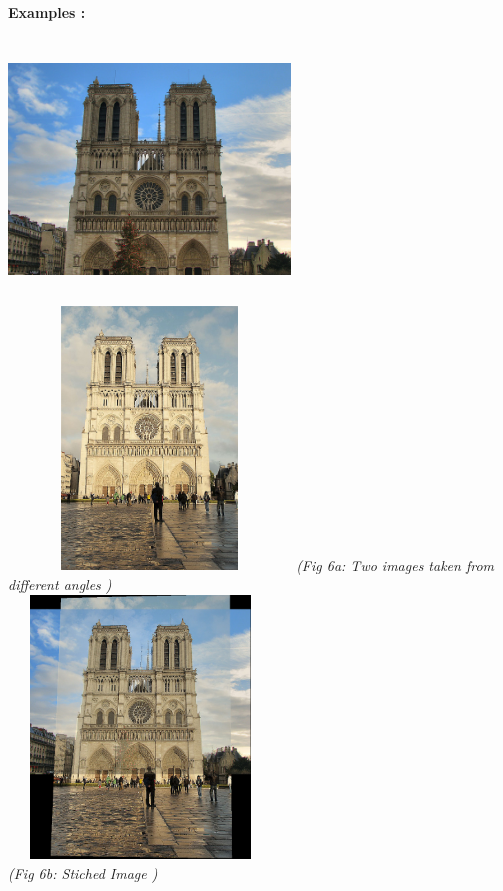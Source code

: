 \documentclass{article}
\begin{document}
\begin{enumerate}
				\textbf{Examples :} 
				\begin{center}
					\includegraphics[height=7cm,width=7.5cm]{333a} \includegraphics[height=7cm,width=7.5cm]{333b} 
					\textit{	(Fig 6a: Two images taken from different angles )} \\
					\includegraphics[height=7cm,width=7cm]{333c}  \\
					\textit{	(Fig 6b: Stiched Image )}
				\end{center}
				\begin{center}

\end{center}
\end{enumerate}
\end{document}
